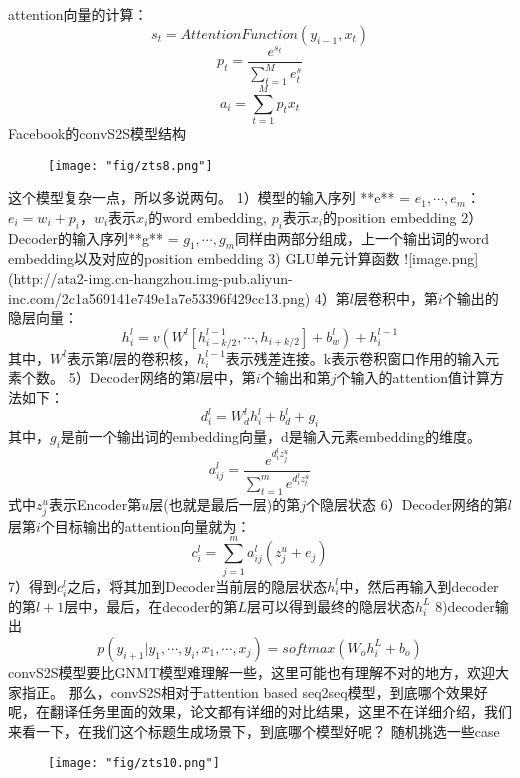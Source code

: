 attention向量的计算：
\begin{equation}
s_t = AttentionF unction(y_{i−1}, x_t)
\end{equation} 
\begin{equation}
p_t = \frac{e^{s_t}}{\sum_{t=1}^{M}{e^s_t}}
\end{equation} 
\begin{equation}
a_i = \sum_{t=1}^{M}{p_tx_t}
\end{equation} 
Facebook的convS2S模型结构
\begin{figure}[!h]
	\centering
	\texttt{[image: "fig/zts8.png"]}
	\caption{}
	\label{fig:zts8}
\end{figure}

这个模型复杂一点，所以多说两句。
1）模型的输入序列 **e** = {$e_{1},\cdots,e_{m}$}：$e_{i} = w_{i} + p_{i}$，$w_{i}$表示$x_{i}$的word embedding, $p_{i}$表示$x_{i}$的position embedding
2）Decoder的输入序列**g** = {$g_{1},\cdots,g_{m}$}同样由两部分组成，上一个输出词的word embedding以及对应的position embedding
3)  GLU单元计算函数
![image.png](http://ata2-img.cn-hangzhou.img-pub.aliyun-inc.com/2c1a569141e749e1a7e53396f429cc13.png)
4）第$l$层卷积中，第$i$个输出的隐层向量：
\begin{equation}
h_{i}^{l} = v(W^l[h_{i - k/2}^{l−1},\cdots,h_{i + k/2}] + b_{w}^{l}) + h_{i}^{l-1}
\end{equation} 
其中，$W^{l}$表示第$l$层的卷积核，$h_{i}^{l-1}$表示残差连接。k表示卷积窗口作用的输入元素个数。
5）Decoder网络的第$l$层中，第$i$个输出和第$j$个输入的attention值计算方法如下：
\begin{equation}
d_{i}^{l} = W_{d}^{l}h_{i}^{l} + b_{d}^{l} + g_{i}
\end{equation}
其中，$g_{i}$是前一个输出词的embedding向量，d是输入元素embedding的维度。
\begin{equation}
a_{ij}^{l} = \frac{e^{d_{i}^{l}z_{j}^{u}}}{\sum_{t=1}^{m}{e^{d_{i}^{l}z_{t}^{u}}}}
\end{equation}
式中$z_{j}^{u}$表示Encoder第$u$层(也就是最后一层)的第$j$个隐层状态
6）Decoder网络的第$l$层第$i$个目标输出的attention向量就为：
\begin{equation}
c_{i}^{l} = \sum_{j = 1}^{m}{a_{ij}^{l}(z_{j}^{u} + e_{j})}
\end{equation}
7）得到$c_{i}^{l}$之后，将其加到Decoder当前层的隐层状态$h_{i}^{l}$中，然后再输入到decoder的第$l+1$层中，最后，在decoder的第$L$层可以得到最终的隐层状态$h_{i}^{L}$
8)decoder输出
 \begin{equation}
p(y_{i+1}|y_{1},\cdots,y_{i},x_{1},\cdots,x_{j}) = softmax(W_{o}h_{i}^{L} + b_{o})
\end{equation}
convS2S模型要比GNMT模型难理解一些，这里可能也有理解不对的地方，欢迎大家指正。
那么，convS2S相对于attention based seq2seq模型，到底哪个效果好呢，在翻译任务里面的效果，论文都有详细的对比结果，这里不在详细介绍，我们来看一下，在我们这个标题生成场景下，到底哪个模型好呢？
随机挑选一些case
\begin{figure}[!h]
	\centering
	\texttt{[image: "fig/zts10.png"]}
	\caption{}
	\label{fig:zts10}
\end{figure}


